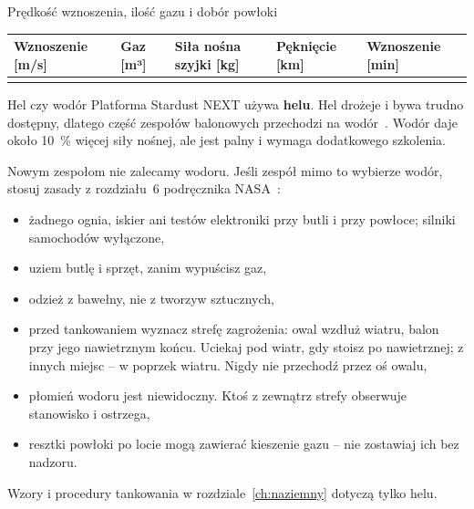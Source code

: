 \begin{sekcja}{Prędkość wznoszenia, ilość gazu i dobór powłoki}
\small
\begin{tabularx}{\linewidth}{@{}YYYYY@{}}
\toprule
\textbf{Wznoszenie [m/s]} & \textbf{Gaz [m³]} & \textbf{Siła nośna szyjki [kg]} & \textbf{Pęknięcie [km]} & \textbf{Wznoszenie [min]}\\\midrule
{}
\bottomrule
\end{tabularx}
\normalsize
{}
\end{sekcja}

\begin{sekcja}{Hel czy wodór}\label{sec:hel-wodor}
Platforma Stardust NEXT używa \textbf{helu}. Hel drożeje i bywa trudno dostępny, dlatego część zespołów balonowych przechodzi na wodór~\cite[rozdz.~2]{nasahb}. Wodór daje około \SI{10}{\percent} więcej siły nośnej, ale jest palny i wymaga dodatkowego szkolenia.

\begin{uwaga}Nowym zespołom nie zalecamy wodoru. Jeśli zespół mimo to wybierze wodór, stosuj zasady z rozdziału~6 podręcznika NASA~\cite{nasahb}:
\begin{itemize}
  \item żadnego ognia, iskier ani testów elektroniki przy butli i przy powłoce; silniki samochodów wyłączone,
  \item uziem butlę i sprzęt, zanim wypuścisz gaz,
  \item odzież z bawełny, nie z tworzyw sztucznych,
  \item przed tankowaniem wyznacz strefę zagrożenia: owal wzdłuż wiatru, balon przy jego nawietrznym końcu. Uciekaj pod wiatr, gdy stoisz po nawietrznej; z innych miejsc -- w poprzek wiatru. Nigdy nie przechodź przez oś owalu,
  \item płomień wodoru jest niewidoczny. Ktoś z zewnątrz strefy obserwuje stanowisko i ostrzega,
  \item resztki powłoki po locie mogą zawierać kieszenie gazu -- nie zostawiaj ich bez nadzoru.
\end{itemize}
Wzory i procedury tankowania w rozdziale~\ref{ch:naziemny} dotyczą tylko helu.\end{uwaga}
\end{sekcja}


